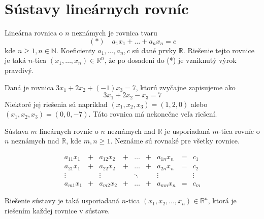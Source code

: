 \section{Sústavy lineárnych rovníc}

\begin{definition}
Lineárna rovnica o $n$ neznámych je rovnica tvaru
$$ (*) \quad a_{1}x_{1} + \dots + a_{n}x_{n} = c $$
kde $n \ge 1, n \in \mathbb{N}$. Koeficienty $a_1, \dots, a_n, c$ sú dané prvky $\mathbb{R}$. Riešenie tejto rovnice je taká $n$-tica $(x_1, \dots, x_n) \in \mathbb{R}^n$, že po dosadení do (*) je vzniknutý výrok pravdivý.
\end{definition}

\begin{example}
Daná je rovnica $3x_{1} + 2x_{2} + (-1)x_{3} = 7$, ktorú zvyčajne zapisujeme ako
$$ 3x_{1} + 2x_{2} - x_{3} = 7 $$
Niektoré jej riešenia sú napríklad $(x_{1}, x_{2}, x_{3}) = (1, 2, 0)$ alebo $(x_{1}, x_{2}, x_{3}) = (0, 0, -7)$. Táto rovnica má nekonečne veľa riešení.
\end{example}

\begin{definition}
Sústava $m$ lineárnych rovníc o $n$ neznámych nad $\mathbb{R}$ je usporiadaná
$m$-tica rovníc o $n$ neznámych nad $\mathbb{R}$, kde $m, n \ge 1$. Neznáme sú
rovnaké pre všetky rovnice.
\end{definition}

\begin{equation}\label{eq:sustava}
\begin{array}{ccccccccc}
a_{11}x_{1} & + & a_{12}x_{2} & + & \dots & + & a_{1n}x_{n} & = & c_{1} \\
a_{21}x_{1} & + & a_{22}x_{2} & + & \dots & + & a_{2n}x_{n} & = & c_{2} \\
\vdots & & \vdots & & \ddots & & \vdots & & \vdots \\
a_{m1}x_{1} & + & a_{m2}x_{2} & + & \dots & + & a_{mn}x_{n} & = & c_{m}
\end{array}
\end{equation}

Riešenie sústavy je taká usporiadaná $n$-tica $(x_{1}, x_{2}, \dots, x_{n}) \in \mathbb{R}^{n}$, ktorá je riešením každej rovnice v sústave.

